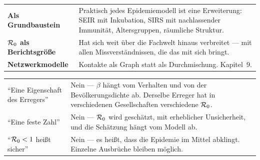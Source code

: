 \begin{forschung}
\begin{center}
{\small
\renewcommand{\arraystretch}{1.45}
\begin{tabular}{@{}P{2.8cm}P{5.4cm}@{}}
\toprule
\textbf{Als Grundbaustein} & Praktisch jedes Epidemiemodell ist eine Erweiterung: SEIR mit Inkubation, SIRS mit nachlassender Immunität, Altersgruppen, räumliche Struktur.\\
\textbf{$\mathcal{R}_0$ als Berichtsgröße} & Hat sich weit über die Fachwelt hinaus verbreitet --- mit allen Missverständnissen, die das mit sich bringt.\\
\textbf{Netzwerk\-modelle} & Kontakte als Graph statt als Durchmischung. Kapitel~9.\\
\bottomrule
\end{tabular}}
\end{center}

\begin{center}
{\small
\renewcommand{\arraystretch}{1.48}
\begin{tabular}{@{}P{3.0cm}P{5.2cm}@{}}
\toprule
\textcolor{akzent}{\enquote{Eine Eigenschaft des Erregers}} & Nein --- $\beta$ hängt vom Verhalten und von der Bevölkerungsdichte ab. Derselbe Erreger hat in verschiedenen Gesellschaften verschiedene $\mathcal{R}_0$.\\
\textcolor{akzent}{\enquote{Eine feste Zahl}} & Nein --- $\mathcal{R}_0$ wird geschätzt, mit erheblicher Unsicherheit, und die Schätzung hängt vom Modell ab.\\
\textcolor{akzent}{\enquote{$\mathcal{R}_0<1$ heißt sicher}} & Nein --- es heißt, dass die Epidemie im Mittel abklingt. Einzelne Ausbrüche bleiben möglich.\\
\bottomrule
\end{tabular}}
\end{center}

\begin{center}
\begin{minipage}{0.88\textwidth}
\end{minipage}
\end{center}


\end{forschung}
